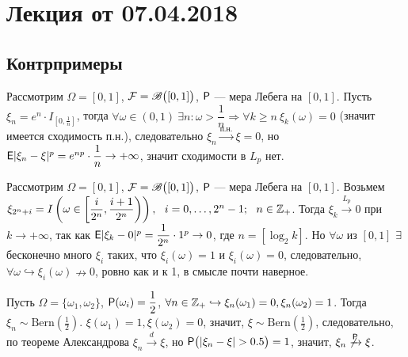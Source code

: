 \section{Лекция от 07.04.2018}
\subsection{Контрпримеры}
\begin{example}
	Рассмотрим $\Omega = [0, 1]$, $\F = \B\big([0,1] \big)$, $\P$ --- мера Лебега на $[0, 1]$. Пусть $\xi_n = e^n \cdot I_{\left[0, \frac{1}{n} \right]}$, тогда $\forall \omega \in (0, 1) \ \exists n : \omega > \dfrac{1}{n} \Rightarrow \forall k \geqslant n \ \xi_k(\omega) = 0$ (значит имеется сходимость п.н.), следовательно $\xi_n \xrightarrow{\text{п.н.}} \xi = 0$, но $\E | \xi_n - \xi |^p = e^{np} \cdot \dfrac{1}{n} \rightarrow + \infty$, значит сходимости в $L_p$ нет.
\end{example}

\begin{example}
	Рассмотрим $\Omega = [0, 1]$, $\F = \B\big([0,1] \big)$, $\P$ --- мера Лебега на $[0, 1]$. 
	Возьмем $\xi_{2^n + i} = I \left( \omega \in \left[ \dfrac{i}{2^n}, \dfrac{i + 1}{2^n} \right) \right), ~~i = 0,\ldots, 2^n - 1;~~n \in \Z_+$. 
	Тогда $\xi_k \xrightarrow{L_p} 0$ при $k \rightarrow + \infty$, так как $\E | \xi_k  - 0 |^p = \dfrac{1}{2^n} \cdot 1^p \rightarrow 0$, где $n = \left[ \log_2 k \right]$. 
	Но $\forall \omega$ из $[0,1]$ $\exists$ бесконечно много $\xi_i$ таких, что $\xi_i(\omega) = 1$ и $\xi_i(\omega) = 0$, следовательно, $\forall \omega \hookrightarrow \xi_i(\omega) \nrightarrow 0$, ровно как и к 1, в смысле почти наверное.
\end{example}

\begin{example} 
	Пусть $\Omega = \{ \omega_1, \omega_2 \}$, $\P(\omega_i) = \dfrac{1}{2}$, $\forall n \in \Z_+ \hookrightarrow \xi_n(\omega_1) = 0, \xi_n(\omega_2) = 1$. Тогда $\xi_n \sim \text{Bern} \left( \frac{1}{2} \right)$. $\xi(\omega_1) = 1, \xi(\omega_2) = 0$, значит, $\xi \sim \text{Bern} \left( \frac{1}{2} \right)$, следовательно, по теореме Александрова $\xi_n \xrightarrow{d} \xi$, но $\P \big( | \xi_n - \xi| > 0.5 \big) = 1$, значит, $\xi_n \not\xrightarrow{\P} \xi$. 
\end{example}

